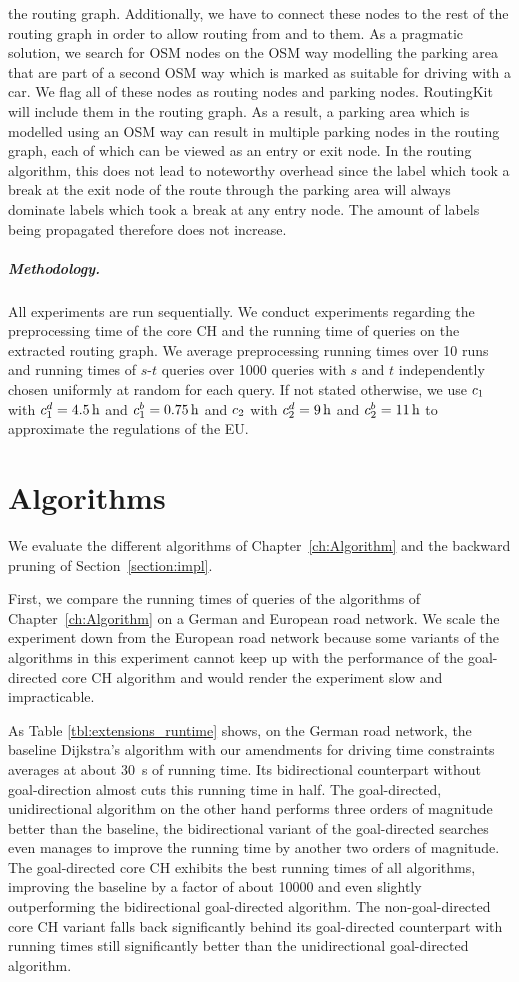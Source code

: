 the routing graph. Additionally, we have to connect these nodes to the rest of the routing graph in order to allow routing from and to them. As a pragmatic solution, we search for OSM nodes on the OSM way modelling the parking area that are part of a second OSM way which is marked as suitable for driving with a car. We flag all of these nodes as routing nodes and parking nodes. RoutingKit will include them in the routing graph. As a result, a parking area which is modelled using an OSM way can result in multiple parking nodes in the routing graph, each of which can be viewed as an entry or exit node. In the routing algorithm, this does not lead to noteworthy overhead since the label which took a break at the exit node of the route through the parking area will always dominate labels which took a break at any entry node. The amount of labels being propagated therefore does not increase.


\subparagraph{Methodology.} All experiments are run sequentially. We conduct experiments regarding the preprocessing time of the core CH and the running time of queries on the extracted routing graph. We average preprocessing running times over \num{10} runs and running times of $s$-$t$ queries over \num{1000} queries with $s$ and $t$ independently chosen uniformly at random for each query. If not stated otherwise, we use $c_1$ with $c_1^d = \SI{4.5}{\hour}$ and $c_1^b = \SI{0.75}{\hour}$ and $c_2$ with $c_2^d = \SI{9}{\hour}$ and $c_2^b = \SI{11}{\hour}$ to approximate the regulations of the EU.

\section{Algorithms}
We evaluate the different algorithms of Chapter~\ref{ch:Algorithm} and the backward pruning of Section~\ref{section:impl}.

First, we compare the running times of queries of the algorithms of Chapter~\ref{ch:Algorithm} on a German and European road network. We scale the experiment down from the European road network because some variants of the algorithms in this experiment cannot keep up with the performance of the goal-directed core CH algorithm and would render the experiment slow and impracticable.

As Table \ref{tbl:extensions_runtime} shows, on the German road network, the baseline Dijkstra's algorithm with our amendments for driving time constraints averages at about \SI{30}{\second} of running time. Its bidirectional counterpart without goal-direction almost cuts this running time in half. The goal-directed, unidirectional algorithm on the other hand performs three orders of magnitude better than the baseline, the bidirectional variant of the goal-directed searches even manages to improve the running time by another two orders of magnitude. The goal-directed core CH exhibits the best running times of all algorithms, improving the baseline by a factor of about \num{10000} and even slightly outperforming the bidirectional goal-directed algorithm. The non-goal-directed core CH variant falls back significantly behind its goal-directed counterpart with running times still significantly better than the unidirectional goal-directed algorithm.


